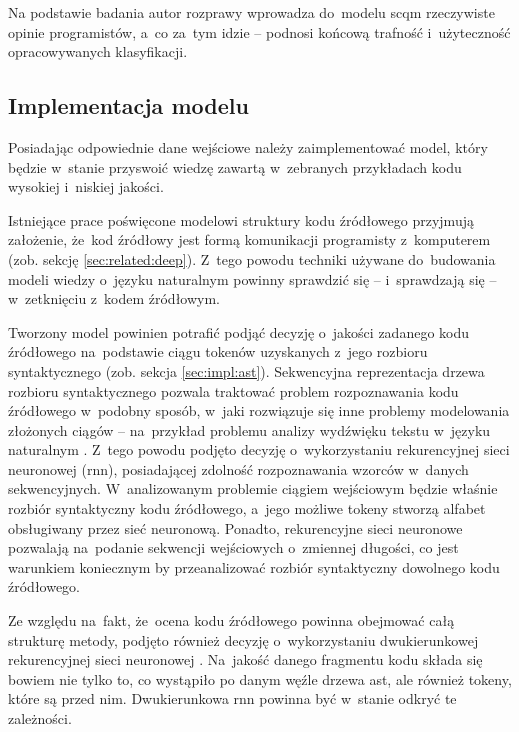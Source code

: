 \documentclass[twoside]{praca}
\begin{document}
Na podstawie badania autor rozprawy wprowadza do~modelu \gls{scqm} rzeczywiste opinie programistów, a~co za~tym idzie -- podnosi końcową trafność i~użyteczność opracowywanych klasyfikacji.

\subsection{Implementacja modelu}
\label{sec:proj:rnn}

Posiadając odpowiednie dane wejściowe należy zaimplementować model, który będzie w~stanie przyswoić wiedzę zawartą w~zebranych przykładach kodu wysokiej i~niskiej jakości.

Istniejące prace poświęcone modelowi struktury kodu źródłowego przyjmują założenie, że~kod źródłowy jest formą komunikacji programisty z~komputerem (zob. sekcję \ref{sec:related:deep}). Z~tego powodu techniki używane do~budowania modeli wiedzy o~języku naturalnym powinny sprawdzić się -- i~sprawdzają się \cite{allamanis2018survey} -- w~zetknięciu z~kodem źródłowym.

Tworzony model powinien potrafić podjąć decyzję o~jakości zadanego kodu źródłowego na~podstawie ciągu tokenów uzyskanych z~jego rozbioru syntaktycznego (zob. sekcja \ref{sec:impl:ast}). Sekwencyjna reprezentacja drzewa rozbioru syntaktycznego pozwala traktować problem rozpoznawania kodu źródłowego w~podobny sposób, w~jaki rozwiązuje się inne problemy modelowania złożonych ciągów -- na~przykład problemu analizy wydźwięku tekstu w~języku naturalnym \cite{dong2014adaptive}. Z~tego powodu podjęto decyzję o~wykorzystaniu rekurencyjnej sieci neuronowej (\gls{rnn}), posiadającej zdolność rozpoznawania wzorców w~danych sekwencyjnych. W~analizowanym problemie ciągiem wejściowym będzie właśnie rozbiór syntaktyczny kodu źródłowego, a~jego możliwe tokeny stworzą alfabet obsługiwany przez sieć neuronową. Ponadto, rekurencyjne sieci neuronowe pozwalają na~podanie sekwencji wejściowych o~zmiennej długości, co jest warunkiem koniecznym by przeanalizować rozbiór syntaktyczny dowolnego kodu źródłowego.

Ze względu na~fakt, że~ocena kodu źródłowego powinna obejmować całą strukturę metody, podjęto również decyzję o~wykorzystaniu dwukierunkowej rekurencyjnej sieci neuronowej \cite{schuster1997bidirectional}. Na~jakość danego fragmentu kodu składa się bowiem nie tylko to, co wystąpiło po danym węźle drzewa \gls{ast}, ale również tokeny, które są przed nim. Dwukierunkowa \gls{rnn} powinna być w~stanie odkryć te zależności.
\end{document}

